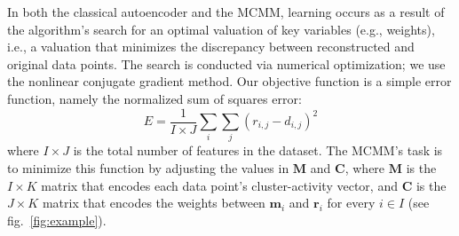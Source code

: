 
In both the classical autoencoder and the MCMM, learning occurs as a
result of the algorithm's search for an optimal valuation of key variables (e.g., weights), 
i.e., a valuation that minimizes %
the discrepancy between
reconstructed and original data points.  The search is conducted
via %
numerical optimization; we use the nonlinear conjugate gradient method.
%
Our objective function is a simple error function, namely the
normalized sum of squares error:
\begin{equation}
E = \frac{1}{I \times J} \sum_{i} \sum_{j} {(r_{i,j} - d_{i,j})}^2
\end{equation}
 where $I \times J$ is the total number of features in the dataset.
The MCMM's task is to minimize this function by adjusting the
 values in $\mathbf{M}$ and $\mathbf{C}$, where
$\mathbf{M}$ is the $I \times K$ matrix that
encodes each data point's cluster-activity vector, 
and $\mathbf{C}$ is the $J \times K$ matrix that
encodes the weights between $\mathbf{m}_i$ and $\mathbf{r}_i$ for every $i \in I$ (see fig.~\ref{fig:example}). 



